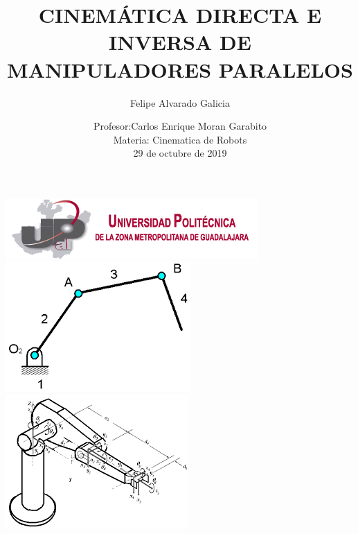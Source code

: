 \documentclass[12pt,a4paper]{article}
\author{Felipe Alvarado Galicia}
\title{CINEMÁTICA DIRECTA E INVERSA DE MANIPULADORES PARALELOS}
\date{Profesor:Carlos Enrique Moran Garabito\\
Materia: Cinematica de Robots\\
29 de octubre de 2019}
\begin{document}
\maketitle
 \includegraphics[scale=1]{logo1.png}\\
\includegraphics[scale=1]{imag5.png} 
\includegraphics[scale=1]{imag8.png}\\\\\\\\\\\\\\\\\\\\\\\\\\\\\\\\\\\\\\\\\\\\\\
\end{document}
